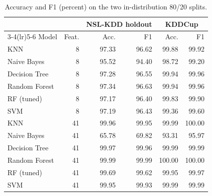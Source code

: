 \begin{table}[t]
\centering
\caption{Accuracy and F1 (percent) on the two in-distribution 80/20 splits.}
\label{tab:holdout}
\footnotesize
\setlength{\tabcolsep}{2.5pt}
\begin{tabular}{lrrrrr}
\toprule
 & & \multicolumn{2}{c}{NSL-KDD holdout} & \multicolumn{2}{c}{KDDCup} \\
\cmidrule(lr){3-4}\cmidrule(lr){5-6}
Model & Feat. & Acc. & F1 & Acc. & F1 \\
\midrule
KNN & 8 & 97.33 & 96.62 & 99.88 & 99.92 \\
Naive Bayes & 8 & 95.52 & 94.40 & 98.72 & 99.20 \\
Decision Tree & 8 & 97.28 & 96.55 & 99.94 & 99.96 \\
Random Forest & 8 & 97.34 & 96.63 & 99.94 & 99.96 \\
RF (tuned) & 8 & 97.17 & 96.40 & 99.83 & 99.90 \\
SVM & 8 & 97.19 & 96.43 & 99.36 & 99.60 \\
\midrule
KNN & 41 & 99.96 & 99.95 & 99.99 & 100.00 \\
Naive Bayes & 41 & 65.78 & 69.82 & 93.31 & 95.97 \\
Decision Tree & 41 & 99.97 & 99.96 & 99.99 & 99.99 \\
Random Forest & 41 & 99.99 & 99.99 & 100.00 & 100.00 \\
RF (tuned) & 41 & 99.69 & 99.62 & 99.95 & 99.97 \\
SVM & 41 & 99.95 & 99.93 & 99.99 & 99.99 \\
\bottomrule
\end{tabular}
\end{table}
